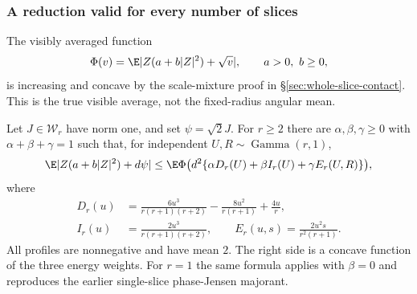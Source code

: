 \subsubsection{A reduction valid for every number of slices}
The visibly averaged function
\[
 \Phi(v)=\E|Z(a+b|Z|^2)+\sqrt v|,\qquad a>0,\ b\ge0,
\]
is increasing and concave by the scale-mixture proof in
\S\ref{sec:whole-slice-contact}. This is the true visible average,
not the fixed-radius angular mean.

\begin{lemma}
\label{lem:multislice-support-reduction}
Let $J\in\mathcal W_r$ have norm one, and set $\psi=\sqrt2J$.
For $r\ge2$ there are $\alpha,\beta,\gamma\ge0$ with
$\alpha+\beta+\gamma=1$ such that, for independent
$U,R\sim\operatorname{Gamma}(r,1)$,
\begin{equation}\label{eq:multislice-support}
 \E|Z(a+b|Z|^2)+d\psi|
 \le\E\Phi\bigl(d^2\{\alpha D_r(U)+\beta I_r(U)+\gamma E_r(U,R)\}\bigr),
\end{equation}
where
\begin{align*}
 D_r(u)&=\frac{6u^3}{r(r+1)(r+2)}
           -\frac{8u^2}{r(r+1)}+\frac{4u}{r},\\
 I_r(u)&=\frac{2u^3}{r(r+1)(r+2)},\qquad
 E_r(u,s)=\frac{2u^2s}{r^2(r+1)}.
\end{align*}
All profiles are nonnegative and have mean $2$.
The right side is a concave function of the three energy weights.
For $r=1$ the same formula applies with $\beta=0$ and reproduces the
earlier single-slice phase-Jensen majorant.
\end{lemma}

